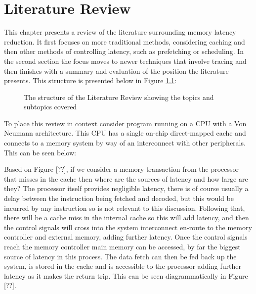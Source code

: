 
\chapter{Literature Review}

This chapter presents a review of the literature surrounding memory latency reduction. It first focuses on more traditional methods, considering caching and then other methods of controlling latency, such as prefetching or scheduling. In the second section the focus moves to newer techniques that involve tracing and then finishes with a summary and evaluation of the position the literature presents. This structure is presented below in Figure \ref{fig:lit-review-schematic}:


\begin{figure}[h]
		\centering
		
		\label{fig:lit-review-schematic}
		\caption[Literature Review Structure]{The structure of the Literature Review showing the topics and subtopics covered}
\end{figure}


To place this review in context consider program running on a CPU with a Von Neumann architecture. This CPU has a single on-chip direct-mapped cache and connects to a memory system by way of an interconnect with other peripherals. This can be seen below:


Based on Figure [??], if we consider a memory transaction from the processor that misses in the cache then where are the sources of latency and how large are they? The processor itself provides negligible latency, there is of course usually a delay between the instruction being fetched and decoded, but this would be incurred by any instruction so is not relevant to this discussion. Following that, there will be a cache miss in the internal cache so this will add latency, and then the control signals will cross into the system interconnect en-route to the memory controller and external memory, adding further latency. Once the control signals reach the memory controller main memory can be accessed, by far the biggest source of latency in this process. The data fetch can then be fed back up the system, is stored in the cache and is accessible to the processor adding further latency as it makes the return trip. This can be seen diagrammatically in Figure [??]. 


